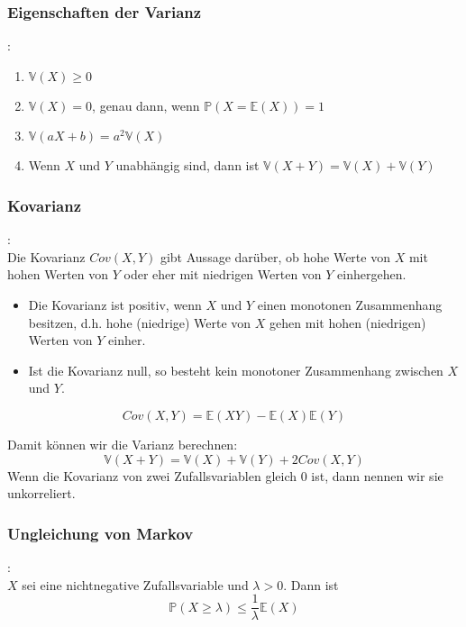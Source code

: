 {    \subsubsection{Eigenschaften der Varianz}
    \begin{definition}:\label{def:varianz_eigenschaften}
    \begin{enumerate}[1)]
        \item $\mathbb V\left(X\right)\ge 0$
        \item $\mathbb V\left(X\right)=0$, genau dann, wenn $\mathbb P\left(X=\mathbb E\left(X\right)\right)=1$
        \item $\mathbb V\left(aX+b\right)=a^{2}\mathbb V\left(X\right)$
        \item Wenn $X$ und $Y$ unabhängig sind, dann ist $\mathbb V\left(X+Y\right)=\mathbb V\left(X\right)+\mathbb V(Y)$
    \end{enumerate}
    \end{definition}

    \subsubsection{Kovarianz}
    \begin{definition}[Kovarianz]:\\
    Die Kovarianz $Cov\left(X,Y\right)$ gibt Aussage darüber, ob hohe Werte
    von $X$ mit hohen Werten von $Y$ oder eher mit niedrigen Werten von $Y$
    einhergehen.

    \begin{itemize}
        \item Die Kovarianz ist positiv, wenn $X$ und $Y$ einen monotonen Zusammenhang
        besitzen, d.h. hohe (niedrige) Werte von $X$ gehen mit hohen (niedrigen)
        Werten von $Y$ einher.
        \item Ist die Kovarianz null, so besteht kein monotoner Zusammenhang zwischen $X$ und $Y$.
    \end{itemize}
    \[Cov\left(X,Y\right)=\mathbb E\left(XY\right)-\mathbb E\left(X\right)\mathbb E\left(Y\right)\]
    \end{definition}
    Damit können wir die Varianz berechnen:
    \[\mathbb V\left(X+Y\right)=\mathbb V\left(X\right)+\mathbb V\left(Y\right)+2Cov\left(X,Y\right)\]
    Wenn die Kovarianz von zwei Zufallsvariablen gleich 0 ist, dann nennen wir sie unkorreliert.

    \subsubsection{Ungleichung von Markov}
    \begin{definition}:\\
    $X$ sei eine nichtnegative Zufallsvariable und  $\lambda>0$. Dann ist
    \[
    \mathbb P\left(X\ge \lambda \right)\le \frac{1}{\lambda }\mathbb E(X)
    \]
    \end{definition}

}
